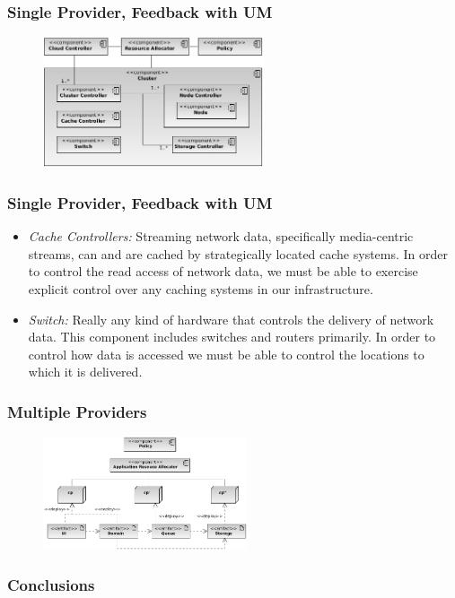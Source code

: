 \documentclass[t, 10pt]{beamer}
\begin{document}
\begin{frame}
\frametitle{Single Provider, Feedback with UM}

\begin{figure}
\includegraphics[width = 6.5cm]{Single-UM}
\end{figure}

\end{frame}

\begin{frame}
\frametitle{Single Provider, Feedback with UM}

\begin{itemize}
\item \textit{Cache Controllers:} Streaming network data, specifically media-centric streams, can and are cached by strategically located cache systems.  In order to control the read access of network data, we must be able to exercise explicit control over any caching systems in our infrastructure.
\item \textit{Switch:} Really any kind of hardware that controls the delivery of network data.  This component includes switches and routers primarily.  In order to control how data is accessed we must be able to control the locations to which it is delivered.
\end{itemize}

\end{frame}

\begin{frame}
\frametitle{Multiple Providers}

\begin{figure}
\includegraphics[width = 6cm]{Multiple}
\end{figure}

\end{frame}

\begin{frame}
\frametitle{Conclusions}

\end{frame}

%
%
\end{document}
